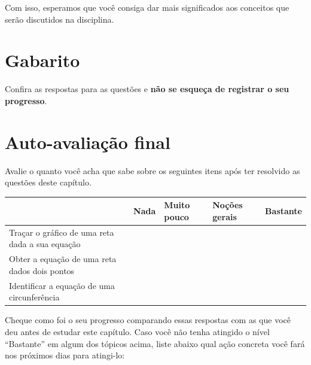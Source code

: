 \documentclass[main.tex]{subfiles}
\begin{document}
Com isso, esperamos que você consiga dar mais significados aos conceitos que serão discutidos na disciplina.

\section{Gabarito}

Confira as respostas para as questões e \textbf{não se esqueça de registrar o seu progresso}.

\imprimeGabarito

\paraAlunos

\section{Auto-avaliação final}
Avalie o quanto você acha que sabe sobre os seguintes itens após ter resolvido as questões deste capítulo.

\begin{center}
 \begin{tabular}{|p{35mm}||p{15mm}|p{15mm}|p{15mm}|p{15mm}|} 
 \hline
   & Nada & Muito pouco & Noções gerais & Bastante\\
 \hline
 Traçar o gráfico de uma reta dada a sua equação &  &  &  &  \\ 
 \hline
 Obter a equação de uma reta dados dois pontos &  &  &  &  \\
 \hline
 Identificar a equação de uma circunferência &  &  &  &  \\
 \hline
\end{tabular}
\end{center}

Cheque como foi o seu progresso comparando essas respostas com as que você deu antes de estudar este capítulo. Caso você não tenha atingido o nível ``Bastante''  em algum dos tópicos acima, liste abaixo qual ação concreta você fará nos próximos dias para atingi-lo:

\paraAmbos
\end{document}
